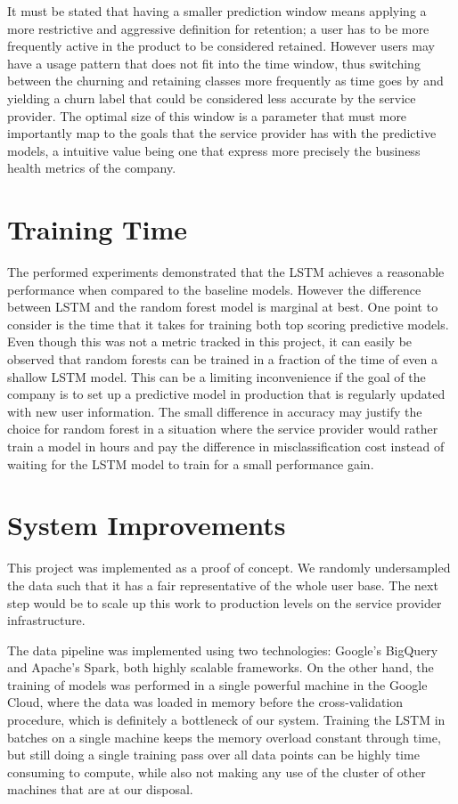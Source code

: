 \documentclass{kththesis}
\begin{document}
It must be stated that having a smaller prediction window means applying a more restrictive and aggressive definition for retention; a user has to be more frequently active in the product to be considered retained. However users may have a usage pattern that does not fit into the time window, thus switching between the churning and retaining classes more frequently as time goes by and yielding a churn label that could be considered less accurate by the service provider. The optimal size of this window is a parameter that must more importantly map to the goals that the service provider has with the predictive models, a intuitive value being one that express more precisely the business health metrics of the company.

\section{Training Time}

The performed experiments demonstrated that the LSTM achieves a reasonable performance when compared to the baseline models. However the difference between LSTM and the random forest model is marginal at best. One point to consider is the time that it takes for training both top scoring predictive models. Even though this was not a metric tracked in this project, it can easily be observed that random forests can be trained in a fraction of the time of even a shallow LSTM model. This can be a limiting inconvenience if the goal of the company is to set up a predictive model in production that is regularly updated with new user information. The small difference in accuracy may justify the choice for random forest in a situation where the service provider would rather train a model in hours and pay the difference in misclassification cost instead of waiting for the LSTM model to train for a small performance gain. 

\section{System Improvements}

This project was implemented as a proof of concept. We randomly undersampled the data such that it has a fair representative of the whole user base. The next step would be to scale up this work to production levels on the service provider infrastructure. 

The data pipeline was implemented using two technologies: Google's BigQuery and Apache's Spark, both highly scalable frameworks. On the other hand, the training of models was performed in a single powerful machine in the Google Cloud, where the data was loaded in memory before the cross-validation procedure, which is definitely a bottleneck of our system. Training the LSTM in batches on a single machine keeps the memory overload constant through time, but still doing a single training pass over all data points can be highly time consuming to compute, while also not making any use of the cluster of other machines that are at our disposal. 
\end{document}
